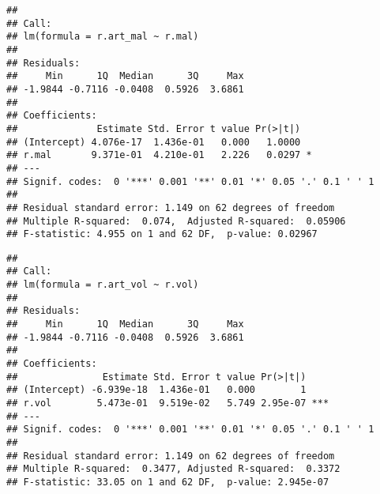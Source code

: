 \documentclass[]{article}
\newenvironment{Shaded}{\begin{snugshade}}{\end{snugshade}}
\newcommand{\KeywordTok}[1]{\textcolor[rgb]{0.13,0.29,0.53}{\textbf{#1}}}
\newcommand{\StringTok}[1]{\textcolor[rgb]{0.31,0.60,0.02}{#1}}
\newcommand{\CommentTok}[1]{\textcolor[rgb]{0.56,0.35,0.01}{\textit{#1}}}
\newcommand{\OperatorTok}[1]{\textcolor[rgb]{0.81,0.36,0.00}{\textbf{#1}}}
\newcommand{\NormalTok}[1]{#1}
\begin{document}
\begin{Shaded}
\end{Shaded}

\begin{verbatim}
## 
## Call:
## lm(formula = r.art_mal ~ r.mal)
## 
## Residuals:
##     Min      1Q  Median      3Q     Max 
## -1.9844 -0.7116 -0.0408  0.5926  3.6861 
## 
## Coefficients:
##              Estimate Std. Error t value Pr(>|t|)  
## (Intercept) 4.076e-17  1.436e-01   0.000   1.0000  
## r.mal       9.371e-01  4.210e-01   2.226   0.0297 *
## ---
## Signif. codes:  0 '***' 0.001 '**' 0.01 '*' 0.05 '.' 0.1 ' ' 1
## 
## Residual standard error: 1.149 on 62 degrees of freedom
## Multiple R-squared:  0.074,  Adjusted R-squared:  0.05906 
## F-statistic: 4.955 on 1 and 62 DF,  p-value: 0.02967
\end{verbatim}

\begin{Shaded}
\end{Shaded}

\begin{verbatim}
## 
## Call:
## lm(formula = r.art_vol ~ r.vol)
## 
## Residuals:
##     Min      1Q  Median      3Q     Max 
## -1.9844 -0.7116 -0.0408  0.5926  3.6861 
## 
## Coefficients:
##               Estimate Std. Error t value Pr(>|t|)    
## (Intercept) -6.939e-18  1.436e-01   0.000        1    
## r.vol        5.473e-01  9.519e-02   5.749 2.95e-07 ***
## ---
## Signif. codes:  0 '***' 0.001 '**' 0.01 '*' 0.05 '.' 0.1 ' ' 1
## 
## Residual standard error: 1.149 on 62 degrees of freedom
## Multiple R-squared:  0.3477, Adjusted R-squared:  0.3372 
## F-statistic: 33.05 on 1 and 62 DF,  p-value: 2.945e-07
\end{verbatim}
\end{document}
